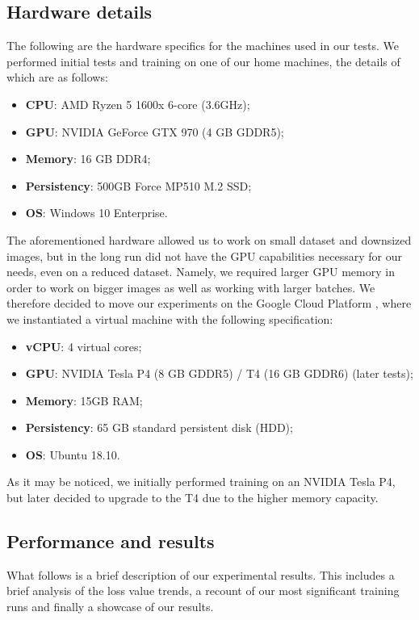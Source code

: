 \documentclass[twoside,twocolumn]{article}
\begin{document}
\subsection{Hardware details}

The following are the hardware specifics for the machines used in our tests. We performed initial tests and training on one of our home machines, the details of which are as follows:
\begin{itemize}
\item \textbf{CPU}: AMD Ryzen 5 1600x  6-core (3.6GHz);
\item \textbf{GPU}: NVIDIA GeForce GTX 970 (4 GB GDDR5);
\item \textbf{Memory}: 16 GB DDR4;
\item \textbf{Persistency}: 500GB Force MP510 M.2 SSD;
\item \textbf{OS}: Windows 10 Enterprise.
\end{itemize}

The aforementioned hardware allowed us to work on small dataset and downsized images, but in the long run did not have the GPU capabilities necessary for our needs, even on a reduced dataset. Namely, we required larger GPU memory in order to work on bigger images as well as working with larger batches. We therefore decided to move our experiments on the Google Cloud Platform \cite{GCP}, where we instantiated a virtual machine with the following specification:

\begin{itemize}
	\item \textbf{vCPU}: 4 virtual cores;
	\item \textbf{GPU}: NVIDIA Tesla P4 (8 GB GDDR5) / T4 (16 GB GDDR6) (later tests);
	\item \textbf{Memory}: 15GB RAM;
	\item \textbf{Persistency}: 65 GB standard persistent disk (HDD);
	\item \textbf{OS}: Ubuntu 18.10.
\end{itemize}

As it may be noticed, we initially performed training on an NVIDIA Tesla P4, but later decided to upgrade to the T4 due to the higher memory capacity.


\subsection{Performance and results}

What follows is a brief description of our experimental results. This includes a brief analysis of the loss value trends, a recount of our most significant training runs and finally a showcase of our results.
\end{document}
